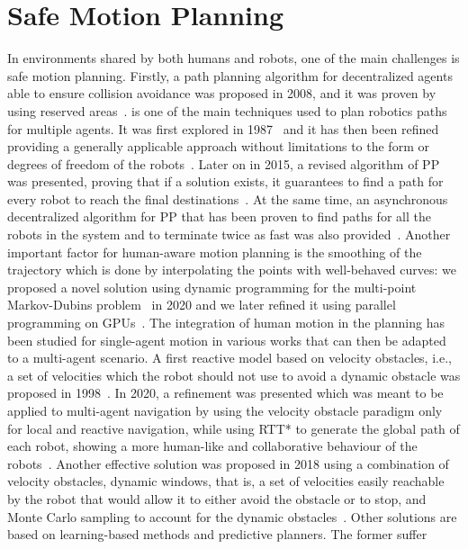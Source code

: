 \section{Safe Motion Planning}
In environments shared by both humans and robots, one of the main challenges is
safe motion planning. Firstly, a path planning algorithm for decentralized 
agents able to ensure collision avoidance was proposed in 2008, and it was 
proven by using reserved areas~\cite{purwin2008}.  is one of the main 
techniques used to plan robotics paths for multiple agents. It was first
explored in 1987~\cite{erdmann1987} and it has then been refined providing a
generally applicable approach without limitations to the form or degrees of
freedom of the robots~\cite{vandenberg2005}. Later on in 2015, a revised
algorithm of PP was presented, proving that if a solution exists, it guarantees
to find a path for every robot to reach the final
destinations~\cite{michal2015}. At the same time, an asynchronous decentralized
algorithm for PP that has been proven to find paths for all the robots in the
system and to terminate twice as fast was also provided~\cite{michal2015}.
Another important factor for human-aware motion planning is the smoothing of
the trajectory which is done by interpolating the points with well-behaved
curves: we proposed a novel solution using dynamic programming for the 
multi-point Markov-Dubins problem~\cite{frego2020} in 2020 and we later refined
it using parallel programming on GPUs~\cite{saccon2021}. \newline
The integration of human motion in the planning has been studied for
single-agent motion in various works that can then be adapted to a multi-agent
scenario. A first reactive model based on velocity obstacles, i.e., a set of
velocities which the robot should not use to avoid a dynamic obstacle was
proposed in 1998~\cite{fiorini1998}. In 2020, a refinement was presented which
was meant to be applied to multi-agent navigation by using the velocity
obstacle paradigm only for local and reactive navigation, while using RTT* to
generate the global path of each robot, showing a more human-like and
collaborative behaviour of the robots~\cite{boldrer2020}. Another effective
solution was proposed in 2018 using a combination of velocity obstacles,
dynamic windows, that is, a set of velocities easily reachable by the robot
that would allow it to either avoid the obstacle or to stop, and Monte Carlo
sampling to account for the dynamic obstacles~\cite{claes2018}. Other solutions
are based on learning-based methods and predictive planners. The former suffer
